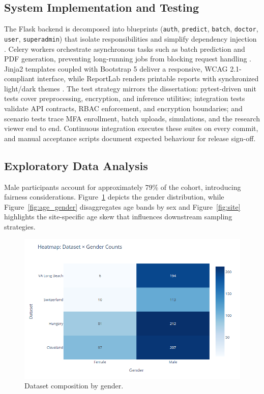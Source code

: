 \documentclass[12pt]{article}
\begin{document}
\subsection{System Implementation and Testing}
The Flask backend is decomposed into blueprints (\texttt{auth}, \texttt{predict}, \texttt{batch}, \texttt{doctor}, \texttt{user}, \texttt{superadmin}) that isolate responsibilities and simplify dependency injection \cite{grinberg2018flask}. Celery workers orchestrate asynchronous tasks such as batch prediction and PDF generation, preventing long-running jobs from blocking request handling \cite{celery}. Jinja2 templates coupled with Bootstrap 5 deliver a responsive, WCAG 2.1-compliant interface, while ReportLab renders printable reports with synchronized light/dark themes \cite{bootstrap5, reportlab, w3c_wcag21}. The test strategy mirrors the dissertation: pytest-driven unit tests cover preprocessing, encryption, and inference utilities; integration tests validate API contracts, RBAC enforcement, and encryption boundaries; and scenario tests trace MFA enrollment, batch uploads, simulations, and the research viewer end to end. Continuous integration executes these suites on every commit, and manual acceptance scripts document expected behaviour for release sign-off.

\subsection{Exploratory Data Analysis}
Male participants account for approximately 79\% of the cohort, introducing fairness considerations. Figure~\ref{fig:gender} depicts the gender distribution, while Figure~\ref{fig:age_gender} disaggregates age bands by sex and Figure~\ref{fig:site} highlights the site-specific age skew that influences downstream sampling strategies.

\begin{figure}[t]
  \centering
  \includegraphics[width=0.85\linewidth]{dataset_composition_by_gender.png}
  \caption{Dataset composition by gender.}
  \label{fig:gender}
\end{figure}
\end{document}
